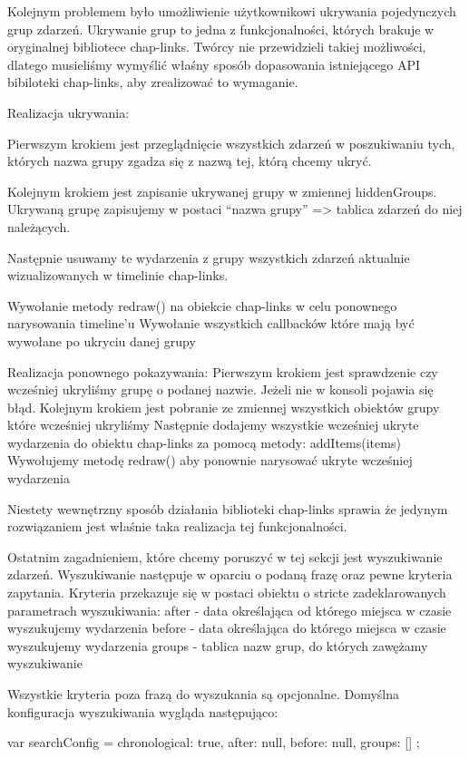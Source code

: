 \documentclass[polish,12pt]{aghthesis}
\begin{document}
{Kolejnym problemem było umożliwienie użytkownikowi ukrywania pojedynczych grup zdarzeń.
Ukrywanie grup to jedna z funkcjonalności, których brakuje w oryginalnej bibliotece chap-links. Twórcy nie przewidzieli takiej możliwości, dlatego musieliśmy wymyślić właśny sposób dopasowania istniejącego API bibiloteki chap-links, aby zrealizować to wymaganie.

Realizacja ukrywania:

Pierwszym krokiem jest przeglądnięcie wszystkich zdarzeń w poszukiwaniu tych, których nazwa grupy zgadza się z nazwą tej, którą chcemy ukryć.

Kolejnym krokiem jest zapisanie ukrywanej grupy w zmiennej hiddenGroups.
Ukrywaną grupę zapisujemy w postaci “nazwa grupy” => tablica zdarzeń do niej należących.

Następnie usuwamy te wydarzenia z grupy wszystkich zdarzeń aktualnie wizualizowanych w timelinie chap-links.

Wywołanie metody redraw() na obiekcie chap-links w celu ponownego narysowania timeline’u
Wywołanie wszystkich callbacków które mają być wywołane po ukryciu danej grupy


Realizacja ponownego pokazywania:
Pierwszym krokiem jest sprawdzenie czy wcześniej ukryliśmy grupę o podanej nazwie. Jeżeli nie w konsoli pojawia się błąd.
Kolejnym krokiem jest pobranie ze zmiennej wszystkich obiektów grupy które wcześniej ukryliśmy
Następnie dodajemy wszystkie wcześniej ukryte wydarzenia do obiektu chap-links za pomocą metody: addItems(items)
Wywołujemy metodę redraw() aby ponownie narysować ukryte wcześniej wydarzenia

Niestety wewnętrzny sposób działania biblioteki chap-links sprawia że jedynym rozwiązaniem jest właśnie taka realizacja tej funkcjonalności.



Ostatnim zagadnieniem, które chcemy poruszyć w tej sekcji jest wyszukiwanie zdarzeń.
Wyszukiwanie następuje w oparciu o podaną frazę oraz pewne kryteria zapytania.
Kryteria przekazuje się w postaci obiektu o stricte zadeklarowanych parametrach wyszukiwania:
after - data określająca od którego miejsca w czasie wyszukujemy wydarzenia
before - data określająca do którego miejsca w czasie wyszukujemy wydarzenia
groups - tablica nazw grup, do których zawężamy wyszukiwanie

Wszystkie kryteria poza frazą do wyszukania są opcjonalne. Domyślna konfiguracja wyszukiwania wygląda następująco:

 var searchConfig = {
                chronological: true,
                after: null,
                before: null,
                groups: []
            };

}
\end{document}
